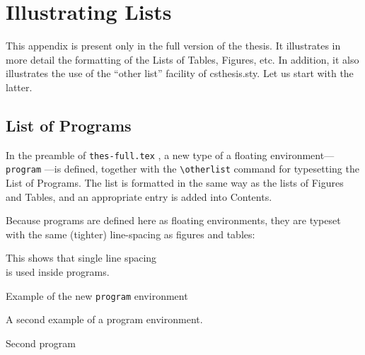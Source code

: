 
%
%

\chapter{Illustrating Lists}\label{app:lists}
\captionsetup[table]{list=no}
\captionsetup[program]{list=no}

This appendix is present only in the full version of the thesis. It
illustrates in more detail the formatting of the Lists of Tables,%
 Figures, etc. In
addition, it also illustrates the use of the ``other list'' facility
of \textsf{csthesis.sty}.
Let us start with the latter.

\section{List of Programs}

In the preamble of \texttt{thes-full.tex}%
, a new type of a floating
environment---\texttt{program}%
---is defined,
together with the \verb+\otherlist+%
 command for
typesetting the List of Programs. The list is formatted in the same
way as the lists of Figures and Tables, and an appropriate entry is
added into Contents.

Because programs are defined here as floating environments, they are
typeset with the same (tighter) line-spacing%
 as figures and tables:

\begin{program}[htbp]
  \begin{center}
    This shows that single line spacing\\
    is used inside programs.
    \caption{Example of the new \texttt{program} environment\label{prog1}}
  \end{center}
\end{program}
%
\vspace*{-.3in}
\begin{program}[htbp]
  \begin{center}
    A second example of a program environment.
    \caption{Second program\label{prog2}}
  \end{center}
\end{program}

